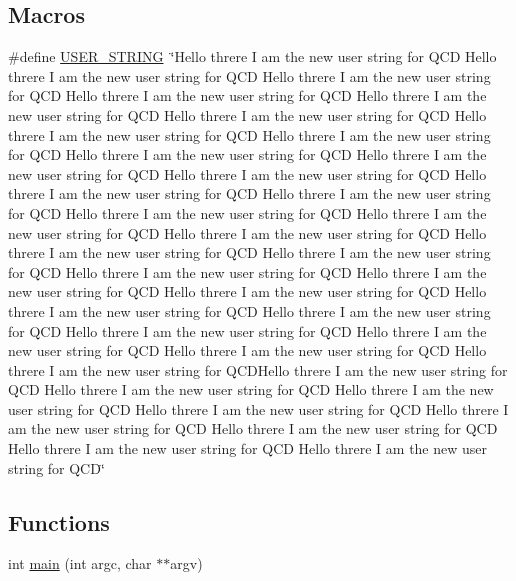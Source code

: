 \subsection*{Macros}
\begin{DoxyCompactItemize}
\item 
\#define \mbox{\hyperlink{adat-devel_2other__libs_2filedb_2src_2SConfCreateTest_8cpp_a5fdc86a0c07ccece3ef65e2f46c0ffd4}{U\+S\+E\+R\+\_\+\+S\+T\+R\+I\+NG}}~\char`\"{}Hello threre I am the new user string for Q\+CD Hello threre I am the new user string for Q\+CD Hello threre I am the new user string for Q\+CD Hello threre I am the new user string for Q\+CD Hello threre I am the new user string for Q\+CD Hello threre I am the new user string for Q\+CD Hello threre I am the new user string for Q\+CD Hello threre I am the new user string for Q\+CD Hello threre I am the new user string for Q\+CD Hello threre I am the new user string for Q\+CD Hello threre I am the new user string for Q\+CD Hello threre I am the new user string for Q\+CD Hello threre I am the new user string for Q\+CD Hello threre I am the new user string for Q\+CD Hello threre I am the new user string for Q\+CD Hello threre I am the new user string for Q\+CD Hello threre I am the new user string for Q\+CD Hello threre I am the new user string for Q\+CD Hello threre I am the new user string for Q\+CD Hello threre I am the new user string for Q\+CD Hello threre I am the new user string for Q\+CD Hello threre I am the new user string for Q\+CD Hello threre I am the new user string for Q\+CD Hello threre I am the new user string for Q\+CD Hello threre I am the new user string for Q\+CD Hello threre I am the new user string for Q\+CD Hello threre I am the new user string for Q\+C\+D\+Hello threre I am the new user string for Q\+CD  Hello threre I am the new user string for Q\+CD Hello threre I am the new user string for Q\+CD Hello threre I am the new user string for Q\+CD Hello threre I am the new user string for Q\+CD Hello threre I am the new user string for Q\+CD Hello threre I am the new user string for Q\+CD Hello threre I am the new user string for Q\+CD\char`\"{}
\end{DoxyCompactItemize}
\subsection*{Functions}
\begin{DoxyCompactItemize}
\item 
int \mbox{\hyperlink{adat-devel_2other__libs_2filedb_2src_2SConfCreateTest_8cpp_a3c04138a5bfe5d72780bb7e82a18e627}{main}} (int argc, char $\ast$$\ast$argv)
\end{DoxyCompactItemize}


